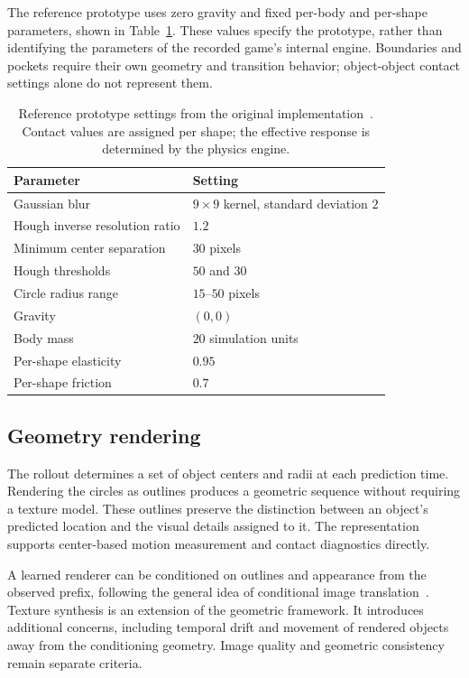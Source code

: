 \documentclass{article}
\begin{document}
The reference prototype uses zero gravity and fixed per-body and per-shape parameters, shown in Table~\ref{tab:settings}. These values specify the prototype, rather than identifying the parameters of the recorded game's internal engine. Boundaries and pockets require their own geometry and transition behavior; object-object contact settings alone do not represent them.

\begin{table}[t]
  \caption{Reference prototype settings from the original implementation~\citep{projectrepo}. Contact values are assigned per shape; the effective response is determined by the physics engine.}
  \label{tab:settings}
  \centering
  \begin{tabular}{ll}
    \toprule
    Parameter & Setting \\
    \midrule
    Gaussian blur & $9\times9$ kernel, standard deviation $2$ \\
    Hough inverse resolution ratio & $1.2$ \\
    Minimum center separation & $30$ pixels \\
    Hough thresholds & $50$ and $30$ \\
    Circle radius range & $15$--$50$ pixels \\
    Gravity & $(0,0)$ \\
    Body mass & $20$ simulation units \\
    Per-shape elasticity & $0.95$ \\
    Per-shape friction & $0.7$ \\
    \bottomrule
  \end{tabular}
\end{table}

\subsection{Geometry rendering}

The rollout determines a set of object centers and radii at each prediction time. Rendering the circles as outlines produces a geometric sequence without requiring a texture model. These outlines preserve the distinction between an object's predicted location and the visual details assigned to it. The representation supports center-based motion measurement and contact diagnostics directly.

A learned renderer can be conditioned on outlines and appearance from the observed prefix, following the general idea of conditional image translation~\citep{isola2017pix2pix}. Texture synthesis is an extension of the geometric framework. It introduces additional concerns, including temporal drift and movement of rendered objects away from the conditioning geometry. Image quality and geometric consistency remain separate criteria.
\end{document}
